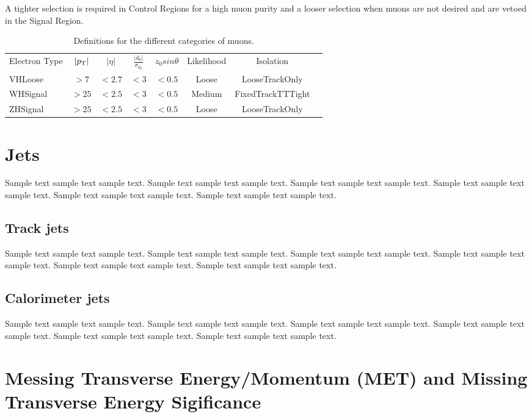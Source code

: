 A tighter selection is required in Control Regions for a high muon purity and a looser selection when muons are not desired and are vetoed in the Signal Region.
\begin{table}[tbh]
\centering
\begin{tabular}{|l|c|c|c|c|c|c|c}

\hline
Electron Type & $|p_{\mathrm{T}}|$ &$|\eta|$ & $\frac{|d_0|}{\sigma_{d_0}}$&$z_0 sin\theta$ & Likelihood &Isolation \\
VHLoose &$>7$&$<2.7$&$<3$&$<0.5$&Loose&LooseTrackOnly\\
WHSignal &$>25$&$<2.5$&$<3$&$<0.5$&Medium&FixedTrackTTTight\\
ZHSignal &$>25$&$<2.5$&$<3$&$<0.5$&Loose&LooseTrackOnly\\
\hline
\end{tabular}
\caption{Definitions for the different categories of muons.}
  \label{tab:mu}
\end{table}


\section{Jets}
\label{sec:jets}
Sample text sample text sample text. Sample text sample text sample text.
Sample text sample text sample text. Sample text sample text sample text.
Sample text sample text sample text. Sample text sample text sample text.
\subsection{Track jets}
\label{sec:track}
Sample text sample text sample text. Sample text sample text sample text.
Sample text sample text sample text. Sample text sample text sample text.
Sample text sample text sample text. Sample text sample text sample text.

\subsection{Calorimeter jets}
\label{sec:calo}
Sample text sample text sample text. Sample text sample text sample text.
Sample text sample text sample text. Sample text sample text sample text.
Sample text sample text sample text. Sample text sample text sample text.

\section{Messing Transverse Energy/Momentum (MET) and Missing Transverse Energy Sigificance}


